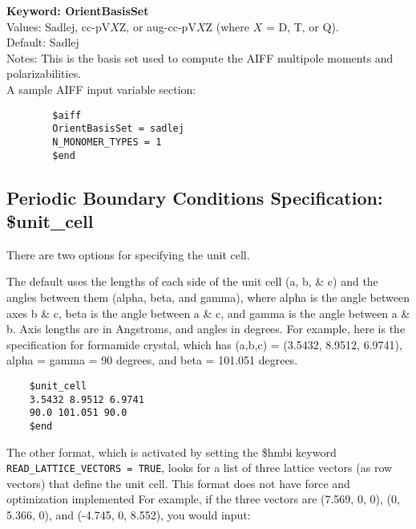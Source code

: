 \documentclass[11pt,letterpaper]{article}
\begin{document}
\begin{spacing}{1.0}
\vspace{3mm}
\noindent
\textbf{Keyword: OrientBasisSet} \\
Values:  Sadlej, cc-pV$X$Z, or aug-cc-pV$X$Z (where $X$ = D, T, or Q). \\
Default: Sadlej \\
Notes: This is the basis set used to compute the AIFF multipole moments
and polarizabilities. \\


\noindent
A sample AIFF input variable section:
\begin{verbatim}
        $aiff
        OrientBasisSet = sadlej
        N_MONOMER_TYPES = 1
        $end
\end{verbatim}

\subsection{Periodic Boundary Conditions Specification: \$unit\_cell}
	There are two options for specifying the unit cell.

	The default uses the lengths of each side of the unit cell (a,
        b, \& c) and the angles between them (alpha, beta, and gamma),
        where alpha is the angle between axes b \& c, beta is the
        angle between a \& c, and gamma is the angle between a \& b.
        Axis lengths are in Angstroms, and angles in degrees.  For
        example, here is the specification for formamide crystal,
        which has (a,b,c) = (3.5432, 8.9512, 6.9741), alpha = gamma =
        90 degrees, and beta = 101.051 degrees.

\begin{verbatim}
	$unit_cell
	3.5432 8.9512 6.9741
	90.0 101.051 90.0
	$end
\end{verbatim}
	The other format, which is activated by setting the \$hmbi
        keyword {\tt READ\_LATTICE\_VECTORS = TRUE}, looks for a list
        of three lattice vectors (as row vectors) that define the unit
        cell. This format does not have
          force and optimization implemented
        For example, if the three vectors are (7.569, 0, 0),
        (0, 5.366, 0), and (-4.745, 0, 8.552), you would input:


\end{spacing}
\end{document}
